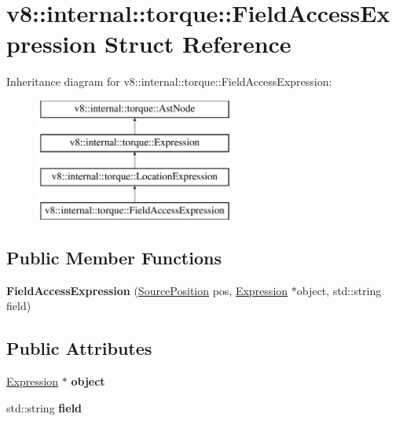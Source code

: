 \hypertarget{structv8_1_1internal_1_1torque_1_1FieldAccessExpression}{}\section{v8\+:\+:internal\+:\+:torque\+:\+:Field\+Access\+Expression Struct Reference}
\label{structv8_1_1internal_1_1torque_1_1FieldAccessExpression}
Inheritance diagram for v8\+:\+:internal\+:\+:torque\+:\+:Field\+Access\+Expression\+:\begin{figure}[H]
\begin{center}
\leavevmode
\includegraphics[height=4.000000cm]{structv8_1_1internal_1_1torque_1_1FieldAccessExpression}
\end{center}
\end{figure}
\subsection*{Public Member Functions}
\begin{DoxyCompactItemize}
\item 
\mbox{\label{structv8_1_1internal_1_1torque_1_1FieldAccessExpression_a75c268479ec983f37bbc5129b40400ab}} 
{\bfseries Field\+Access\+Expression} (\mbox{\hyperlink{structv8_1_1internal_1_1torque_1_1SourcePosition}{Source\+Position}} pos, \mbox{\hyperlink{structv8_1_1internal_1_1torque_1_1Expression}{Expression}} $\ast$object, std\+::string field)
\end{DoxyCompactItemize}
\subsection*{Public Attributes}
\begin{DoxyCompactItemize}
\item 
\mbox{\label{structv8_1_1internal_1_1torque_1_1FieldAccessExpression_ac5d6cc0dd83ebbbc2f84dd4a209e0fbf}} 
\mbox{\hyperlink{structv8_1_1internal_1_1torque_1_1Expression}{Expression}} $\ast$ {\bfseries object}
\item 
\mbox{\label{structv8_1_1internal_1_1torque_1_1FieldAccessExpression_ab59f4df3eb4440b79a644162c23f8aee}} 
std\+::string {\bfseries field}
\end{DoxyCompactItemize}
